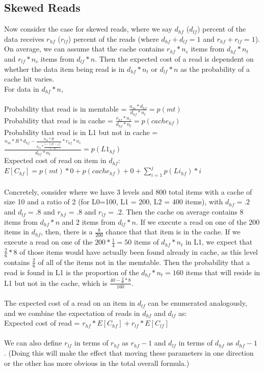 \documentclass[11pt]{article}
\theoremstyle{plain}
\theoremstyle{definition}
\begin{document}
\subsection{Skewed Reads}

Now consider the case for skewed reads, where we say $d_{hf}$ ($d_{lf}$) percent of the data receives $r_{hf}$ ($r_{lf}$) percent of the reads (where $d_{hf} + d_{lf} = 1$ and $r_{hf} + r_{lf} = 1$). On average, we can assume that the cache contains $r_{hf} * n_c$ items from $d_{hf} * n_t$ and $r_{lf} * n_c$ items from $d_{lf} * n$. Then the expected cost of a read is dependent on whether the data item being read is in $d_{hf} * n_t$ or $d_{lf} * n$ as the probability of a cache hit varies.\\
For data in $d_{hf} * n$, \\ \\
Probability that read is in memtable = $\frac{n_m*d_{hf}}{d_{hf} *n_t}  = p(mt)$\\
Probability that read is in cache = $\frac{r_{hf} * n_c}{d_{hf} * n_t} = p(cache_{hf})$ \\
Probability that read is in L1 but not in cache = $ \frac{n_m * R*d_{hf} - \frac{n_m * R}{n_m * \frac{1-(R^j-1)}{1-R}} * r_{hf} * n_c}{d_{hf} * n_t}  = p(L1_{hf})$ \\
Expected cost of read on item in $d_{hf}$: $E[C_{hf}]= p(mt) * 0  + p(cache_{hf}) + 0 + \sum_{i=1}^j p(Li_{hf}) * i$\\ \\
Concretely, consider where we have 3 levels and 800 total items with a cache of size 10 and a ratio of 2  (for L0=100, L1 = 200, L2 = 400 items), with $d_{hf} = .2$ and $d_{lf} = .8$ and $r_{hf}$ = .8 and $r_{lf}$ = .2. Then the cache on average contains 8 items from $d_{hf} * n$ and 2 items from $d_{lf}*n$. If we execute a read on one of the 200 items in $d_{hf}$, then, there is a $\frac{8}{200}$ chance that that item is in the cache. If we execute a read on one of the $200*\frac{1}{4} = 50$ items of  $d_{hf} * n_t$ in L1, we expect that $\frac{2}{6} * 8$ of those items would have actually been found already in cache, as this level contains $\frac{2}{6}$ of all of the items not in the memtable. Then the probability that a read is found in L1 is the proportion of the $d_{hf} * n_t = 160$ items that will reside in L1 but not in the cache, which is $\frac{40 - \frac{2}{6} * 8}{160}$. \\ \\
The expected cost of a read on an item in $d_{lf}$ can be enumerated analogously, and we combine the expectation of reads in $d_{hf}$ and $d_{lf}$ as: \\
Expected cost of read = $r_{hf} * E[C_{hf}] + r_{lf} * E[C_{lf}]$ \\ \\
We can also define $r_{lf}$ in terms of $r_{hf}$ as $r_{hf} - 1$ and  $d_{lf}$ in terms of $d_{hf}$ as $d_{hf} - 1$ . (Doing this will make the effect that moving these parameters in one direction or the other has more obvious in the total overall formula.)
\end{document}
